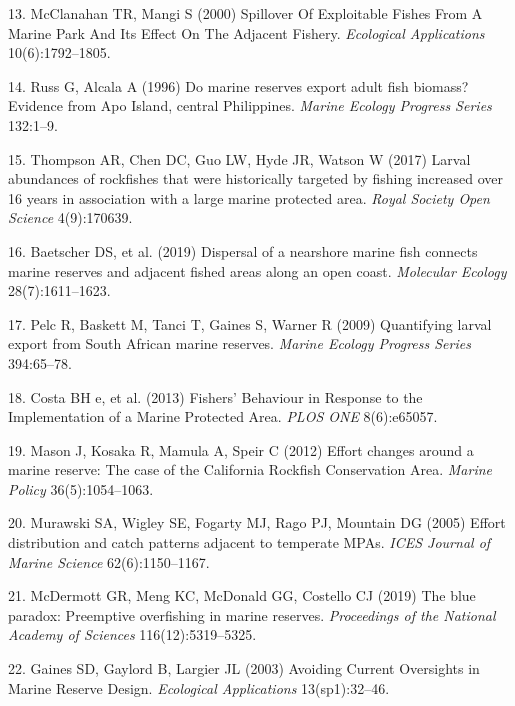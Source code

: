 \documentclass[9pt,twocolumn,twoside,lineno]{pnas-new}
\begin{document}
\leavevmode\hypertarget{ref-mcclanahan2000}{}%
13. McClanahan TR, Mangi S (2000) Spillover Of Exploitable Fishes From A
Marine Park And Its Effect On The Adjacent Fishery. \emph{Ecological
Applications} 10(6):1792--1805.

\leavevmode\hypertarget{ref-russ1996}{}%
14. Russ G, Alcala A (1996) Do marine reserves export adult fish
biomass? Evidence from Apo Island, central Philippines. \emph{Marine
Ecology Progress Series} 132:1--9.

\leavevmode\hypertarget{ref-thompson2017}{}%
15. Thompson AR, Chen DC, Guo LW, Hyde JR, Watson W (2017) Larval
abundances of rockfishes that were historically targeted by fishing
increased over 16 years in association with a large marine protected
area. \emph{Royal Society Open Science} 4(9):170639.

\leavevmode\hypertarget{ref-baetscher2019}{}%
16. Baetscher DS, et al. (2019) Dispersal of a nearshore marine fish
connects marine reserves and adjacent fished areas along an open coast.
\emph{Molecular Ecology} 28(7):1611--1623.

\leavevmode\hypertarget{ref-pelc2009}{}%
17. Pelc R, Baskett M, Tanci T, Gaines S, Warner R (2009) Quantifying
larval export from South African marine reserves. \emph{Marine Ecology
Progress Series} 394:65--78.

\leavevmode\hypertarget{ref-costa2013}{}%
18. Costa BH e, et al. (2013) Fishers' Behaviour in Response to the
Implementation of a Marine Protected Area. \emph{PLOS ONE} 8(6):e65057.

\leavevmode\hypertarget{ref-mason2012}{}%
19. Mason J, Kosaka R, Mamula A, Speir C (2012) Effort changes around a
marine reserve: The case of the California Rockfish Conservation Area.
\emph{Marine Policy} 36(5):1054--1063.

\leavevmode\hypertarget{ref-murawski2005}{}%
20. Murawski SA, Wigley SE, Fogarty MJ, Rago PJ, Mountain DG (2005)
Effort distribution and catch patterns adjacent to temperate MPAs.
\emph{ICES Journal of Marine Science} 62(6):1150--1167.

\leavevmode\hypertarget{ref-mcdermott2019}{}%
21. McDermott GR, Meng KC, McDonald GG, Costello CJ (2019) The blue
paradox: Preemptive overfishing in marine reserves. \emph{Proceedings of
the National Academy of Sciences} 116(12):5319--5325.

\leavevmode\hypertarget{ref-gaines2003}{}%
22. Gaines SD, Gaylord B, Largier JL (2003) Avoiding Current Oversights
in Marine Reserve Design. \emph{Ecological Applications} 13(sp1):32--46.
\end{document}
